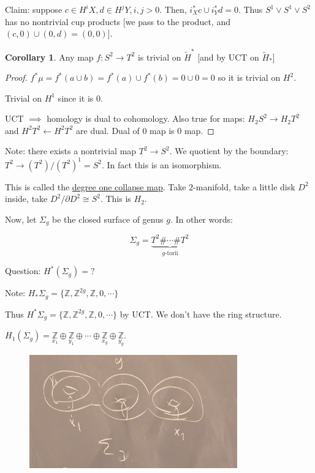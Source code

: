 \documentclass{article}
\theoremstyle{definition}
\newtheorem{corollary}[theorem]{Corollary}
\begin{document}
    Claim: suppose \(c\in H^i X, d\in H^j Y, i,j > 0\). Then, \(i^{\ast}_X c \cup i^{\ast}_Y d = 0\). Thus \(S^1 \vee S^1 \vee S^2\) has no nontrivial cup products [we pass to the product, and \((c,0) \cup (0,d) = (0,0)\)].

    \begin{corollary}
        Any map  \(f: S^2 \to T^2\) is trivial on \(\widetilde{H}^{\ast}\) [and by UCT on \(\widetilde{H}_{\ast}\)]
    \end{corollary}

    \begin{proof}
        \(f^{\ast} \mu = f^{\ast} (a\cup b) = f^{\ast} (a) \cup f^{\ast} (b) = 0 \cup 0 = 0\) so it is trivial on \(H^2\).

        Trivial on \(H^1\) since it is \(0\).

        UCT \(\implies\) homology is dual to cohomology. Also true for maps: \(H_2 S^2 \to H_2 T^2\) and \(H^2 T^2 \leftarrow H^2 T^2\) are dual. Dual of \(0\) map is \(0\) map.
    \end{proof}

    Note: there exists a nontrivial map \(T^2 \to S^2\). We quotient by the boundary: \(T^2 \to (T^2) / (T^2)^1 = S^2\). In fact this is an isomorphism.

    This is called the \underline{degree one collapse map}. Take \(2\)-manifold, take a little disk \(D^2\) inside, take \(D^2 / \partial D^2 \cong S^2\). This is \(H_2\).

    Now, let \(\Sigma_g\) be the closed surface of genus \(g\). In other words:

    \[
        \Sigma_g = \underbrace{T^2 \# \cdots \# T^2}_{g \text{-torii}} 
    \]

    Question: \(H^{\ast} (\Sigma_g) = ?\) 

    Note: \(H_{\ast} \Sigma_g = \{ \mathbb{Z} , \mathbb{Z}^{2g}, \mathbb{Z}, 0, \cdots \}\)

    Thus \(H^{\ast} \Sigma_g = \{ \mathbb{Z} , \mathbb{Z}^{2g}, \mathbb{Z}, 0, \cdots \}\) by UCT. We don't have the ring structure.

    \(H_1(\Sigma_g) = \underset{x_1}{\mathbb{Z}} \oplus \underset{y_1}{\mathbb{Z}} \oplus  \cdots \oplus \underset{x_g}{\mathbb{Z}} \oplus \underset{y_g}{\mathbb{Z}}\).

    \begin{figure}[H]
        \centering
        \includegraphics[width=0.8\textwidth]{img/geng}
    \end{figure}
\end{document}
